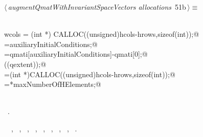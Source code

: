 \documentclass{article}
\begin{document}
\begin{flushleft} \small
\begin{minipage}{\linewidth}\label{scrap73}\raggedright\small
{} $\langle\,${\itshape augmentQmatWithInvariantSpaceVectors allocations}\nobreak\ {\footnotesize {51b}}$\,\rangle\equiv$
\vspace{-1ex}
\begin{list}{}{} \item
\mbox{}\verb@@\\
\mbox{}\verb@   wcols = (int *) CALLOC((unsigned)hcols-hrows,sizeof(int));@\\
\mbox{}\verb@rowsInQ=auxiliaryInitialConditions;@\\
\mbox{}\verb@qextent=qmati[auxiliaryInitialConditions]-qmati[0];@\\
\mbox{}\verb@bumpSparseAim((qextent));@\\
\mbox{}\verb@js=(int *)CALLOC((unsigned)hcols-hrows,sizeof(int));@\\
\mbox{}\verb@originalMaxHElements=*maxNumberOfHElements;@\\
\mbox{}\verb@@\\
\mbox{}\verb@@{\NWsep}
\end{list}
\vspace{-1.5ex}
\footnotesize
\begin{list}{}{\setlength{\itemsep}{-\parsep}\setlength{\itemindent}{-\leftmargin}}
\item \NWtxtMacroRefIn\ .
\item \NWtxtIdentsUsed\nobreak\  \verb@bumpSparseAim@\nobreak\ , \verb@hcols@\nobreak\ , \verb@hrows@\nobreak\ , \verb@js@\nobreak\ , \verb@maxNumberOfHElements@\nobreak\ , \verb@qextent@\nobreak\ , \verb@qmati@\nobreak\ , \verb@rowsInQ@\nobreak\ , \verb@wcols@\nobreak\ .
\item{}
\end{list}
\end{minipage}\vspace{4ex}
\end{flushleft}
\end{document}
